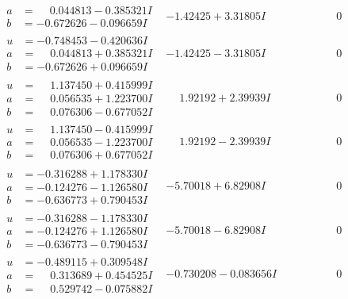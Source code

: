 \documentclass[1p]{elsarticle_modified}
\theoremstyle{definition}
\begin{document}
$$\begin{array}{c|c|c}
\begin{aligned}
a &= \phantom{-}0.044813 - 0.385321 I \\
b &= -0.672626 - 0.096659 I\end{aligned}
 & -1.42425 + 3.31805 I & \phantom{-0.000000 } 0 \\ \hline\begin{aligned}
u &= -0.748453 - 0.420636 I \\
a &= \phantom{-}0.044813 + 0.385321 I \\
b &= -0.672626 + 0.096659 I\end{aligned}
 & -1.42425 - 3.31805 I & \phantom{-0.000000 } 0 \\ \hline\begin{aligned}
u &= \phantom{-}1.137450 + 0.415999 I \\
a &= \phantom{-}0.056535 + 1.223700 I \\
b &= \phantom{-}0.076306 - 0.677052 I\end{aligned}
 & \phantom{-}1.92192 + 2.39939 I & \phantom{-0.000000 } 0 \\ \hline\begin{aligned}
u &= \phantom{-}1.137450 - 0.415999 I \\
a &= \phantom{-}0.056535 - 1.223700 I \\
b &= \phantom{-}0.076306 + 0.677052 I\end{aligned}
 & \phantom{-}1.92192 - 2.39939 I & \phantom{-0.000000 } 0 \\ \hline\begin{aligned}
u &= -0.316288 + 1.178330 I \\
a &= -0.124276 - 1.126580 I \\
b &= -0.636773 + 0.790453 I\end{aligned}
 & -5.70018 + 6.82908 I & \phantom{-0.000000 } 0 \\ \hline\begin{aligned}
u &= -0.316288 - 1.178330 I \\
a &= -0.124276 + 1.126580 I \\
b &= -0.636773 - 0.790453 I\end{aligned}
 & -5.70018 - 6.82908 I & \phantom{-0.000000 } 0 \\ \hline\begin{aligned}
u &= -0.489115 + 0.309548 I \\
a &= \phantom{-}0.313689 + 0.454525 I \\
b &= \phantom{-}0.529742 - 0.075882 I\end{aligned}
 & -0.730208 - 0.083656 I & \phantom{-0.000000 } 0 \\ \hline\begin{aligned}

\end{aligned}
\end{array}$$
\end{document}
